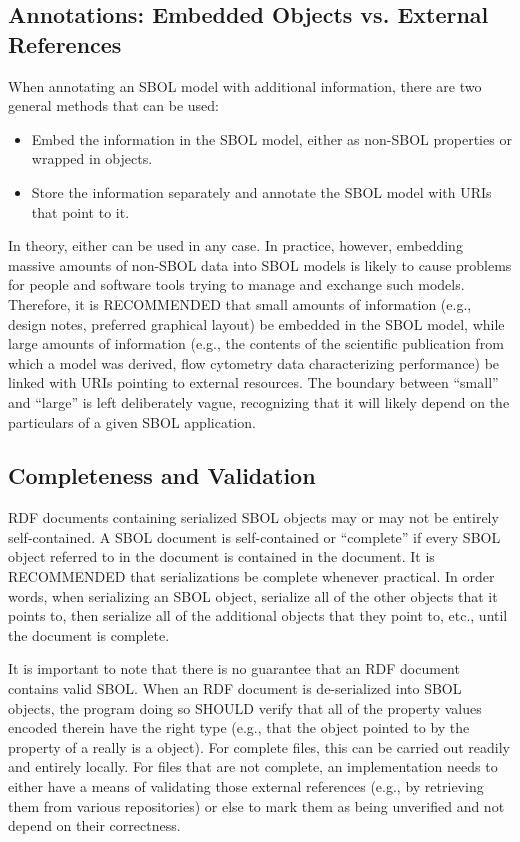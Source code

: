 \subsection{Annotations: Embedded Objects vs. External References}

When annotating an SBOL model with additional information, there are
two general methods that can be used:
\begin{itemize}
\item Embed the information in the SBOL model, either as non-SBOL
  properties or wrapped in  objects.
\item Store the information separately and annotate the SBOL model
  with URIs that point to it.
\end{itemize}
In theory, either can be used in any case.  In practice, however,
embedding massive amounts of non-SBOL data into SBOL models is likely
to cause problems for people and software tools trying to manage and
exchange such models.  Therefore, it is RECOMMENDED that small amounts of information (e.g., design notes, preferred graphical layout) be embedded in the SBOL model, while large amounts of information (e.g., the contents of the scientific publication from which a model was derived, flow cytometry data characterizing performance) be linked with URIs pointing to external resources.  The boundary between ``small'' and ``large'' is left deliberately vague, recognizing that it will likely depend on the particulars of a given SBOL application.

\subsection{Completeness and Validation}

RDF documents containing serialized SBOL objects may or may not be
entirely self-contained.  A SBOL document is self-contained or ``complete'' if every SBOL object referred to in the document is contained in the document.  It is RECOMMENDED that serializations be complete whenever practical.  In order words, when serializing an SBOL object, serialize all of the other objects that it points to, then serialize all of the additional objects that they point to, etc., until the document is complete.

It is important to note that there is no guarantee that an RDF document
contains valid SBOL. When an RDF document is de-serialized into SBOL
objects, the program doing so SHOULD verify that all of the property
values encoded therein have the right type (e.g., that the object
pointed to by the  property of a
 really is a  object).
For complete files, this can be carried out readily and entirely
locally.  For files that are not complete, an implementation needs to
either have a means of validating those external references (e.g., by
retrieving them from various repositories) or else to mark them as
being unverified and not depend on their correctness.

